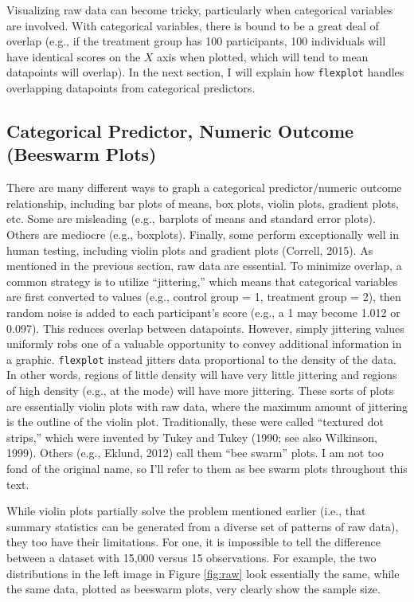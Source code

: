 \documentclass[
  english,
  man]{apa6}
\begin{document}
Visualizing raw data can become tricky, particularly when categorical variables are involved. With categorical variables, there is bound to be a great deal of overlap (e.g., if the treatment group has 100 participants, 100 individuals will have identical scores on the \(X\) axis when plotted, which will tend to mean datapoints will overlap). In the next section, I will explain how \texttt{flexplot} handles overlapping datapoints from categorical predictors.

\hypertarget{categorical-predictor-numeric-outcome-beeswarm-plots}{%
\subsection{Categorical Predictor, Numeric Outcome (Beeswarm Plots)}\label{categorical-predictor-numeric-outcome-beeswarm-plots}}

There are many different ways to graph a categorical predictor/numeric outcome relationship, including bar plots of means, box plots, violin plots, gradient plots, etc. Some are misleading (e.g., barplots of means and standard error plots). Others are mediocre (e.g., boxplots). Finally, some perform exceptionally well in human testing, including violin plots and gradient plots (Correll, 2015). As mentioned in the previous section, raw data are essential. To minimize overlap, a common strategy is to utilize ``jittering,'' which means that categorical variables are first converted to values (e.g., control group = 1, treatment group = 2), then random noise is added to each participant's score (e.g., a 1 may become 1.012 or 0.097). This reduces overlap between datapoints. However, simply jittering values uniformly robs one of a valuable opportunity to convey additional information in a graphic. \texttt{flexplot} instead jitters data proportional to the density of the data. In other words, regions of little density will have very little jittering and regions of high density (e.g., at the mode) will have more jittering. These sorts of plots are essentially violin plots with raw data, where the maximum amount of jittering is the outline of the violin plot. Traditionally, these were called ``textured dot strips,'' which were invented by Tukey and Tukey (1990; see also Wilkinson, 1999). Others (e.g., Eklund, 2012) call them ``bee swarm'' plots. I am not too fond of the original name, so I'll refer to them as bee swarm plots throughout this text.

While violin plots partially solve the problem mentioned earlier (i.e., that summary statistics can be generated from a diverse set of patterns of raw data), they too have their limitations. For one, it is impossible to tell the difference between a dataset with 15,000 versus 15 observations. For example, the two distributions in the left image in Figure \ref{fig:raw} look essentially the same, while the same data, plotted as beeswarm plots, very clearly show the sample size.
\end{document}

